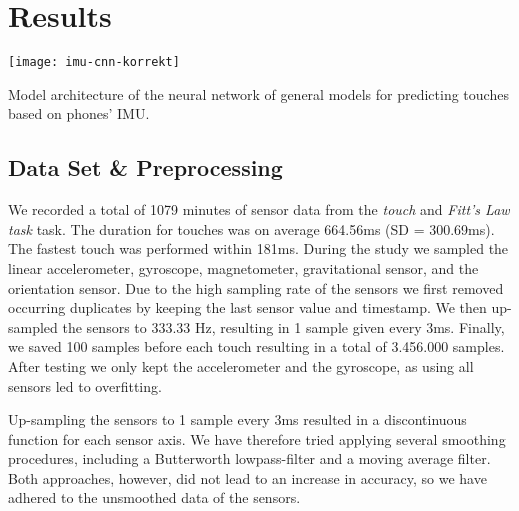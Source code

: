 \section{Results}
\begin{marginfigure}
	\texttt{[image: imu-cnn-korrekt]}
	\caption[Model architecture]{Model architecture of the neural network of general models for predicting touches based on phones' IMU.}
	\label{fig:model_architecture}
\end{marginfigure}
\subsection{Data Set \& Preprocessing}
\label{sec:prepro}

We recorded a total of 1079 minutes of sensor data from the \textit{touch} and \textit{Fitt's Law task} task.
The duration for touches was on average 664.56ms (SD = 300.69ms).
The fastest touch was performed within 181ms.
During the study we sampled the linear accelerometer, gyroscope, magnetometer, gravitational sensor, and the orientation sensor.
Due to the high sampling rate of the sensors we first removed occurring duplicates by keeping the last sensor value and timestamp.
We then up-sampled the sensors to 333.33 Hz, resulting in 1 sample given every 3ms. 
Finally, we saved 100 samples before each touch resulting in a total of 3.456.000 samples.
After testing we only kept the accelerometer and the gyroscope, as using all sensors led to overfitting.

Up-sampling the sensors to 1 sample every 3ms resulted in a discontinuous function for each sensor axis. 
We have therefore tried applying several smoothing procedures, including a Butterworth lowpass-filter and a moving average filter.
Both approaches, however, did not lead to an increase in accuracy, so we have adhered to the unsmoothed data of the sensors.

